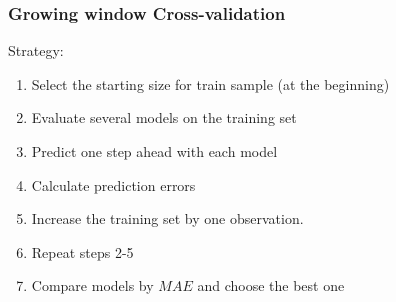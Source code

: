\begin{frame}
	\frametitle{Growing window Cross-validation}
	
	Strategy:
	\begin{enumerate}
		\item Select the starting size for  \alert{train} sample (at the beginning)
		\item Evaluate several models on the training set
		\item Predict one step ahead with each model
		\item Calculate prediction errors
		\item \alert{Increase} the training set by one observation.
		\item Repeat steps 2-5
		\item Compare models by $MAE$ and choose the best one
	\end{enumerate}
	
\end{frame}


